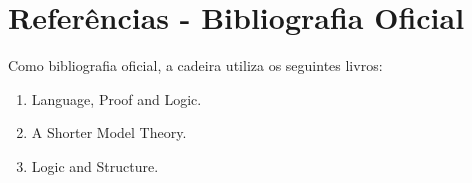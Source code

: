 \documentclass[a4paper]{article}
\begin{document}
\section{Referências - Bibliografia Oficial}
Como bibliografia oficial, a cadeira utiliza os seguintes livros:
\begin{enumerate}
    \item Language, Proof and Logic.\cite{barwise1999language}
    \item A Shorter Model Theory.\cite{hodges1997shorter}
    \item Logic and Structure.\cite{van2012logic}
\end{enumerate}



\end{document}
